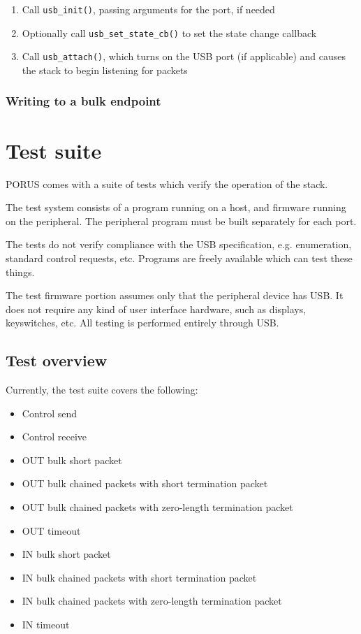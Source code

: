 \documentclass[a4paper]{book}
\newcommand{\ccode}[1]{\texttt{#1}}
\begin{document}
\begin{enumerate}
\item Call \ccode{usb\_init()}, passing arguments for the port, if needed
\item Optionally call \ccode{usb\_set\_state\_cb()} to set the state change callback
\item Call \ccode{usb\_attach()}, which turns on the USB port (if applicable) and causes the stack to begin listening for packets
\end{enumerate}

\subsection{Writing to a bulk endpoint}


\chapter{Test suite}

PORUS comes with a suite of tests which verify the operation of the stack.

The test system consists of a program running on a host, and firmware running on the peripheral.  The peripheral program must be built separately for each port.

The tests do not verify compliance with the USB specification, e.g. enumeration, standard control requests, etc.  Programs are freely available which can test these things.

The test firmware portion assumes only that the peripheral device has USB.  It does not require any kind of user interface hardware, such as displays, keyswitches, etc.  All testing is performed entirely through USB.

\section{Test overview}

Currently, the test suite covers the following:

\begin{itemize}
\item Control send
\item Control receive
\item OUT bulk short packet
\item OUT bulk chained packets with short termination packet
\item OUT bulk chained packets with zero-length termination packet
\item OUT timeout
\item IN bulk short packet
\item IN bulk chained packets with short termination packet
\item IN bulk chained packets with zero-length termination packet
\item IN timeout
\end{itemize}
\end{document}
